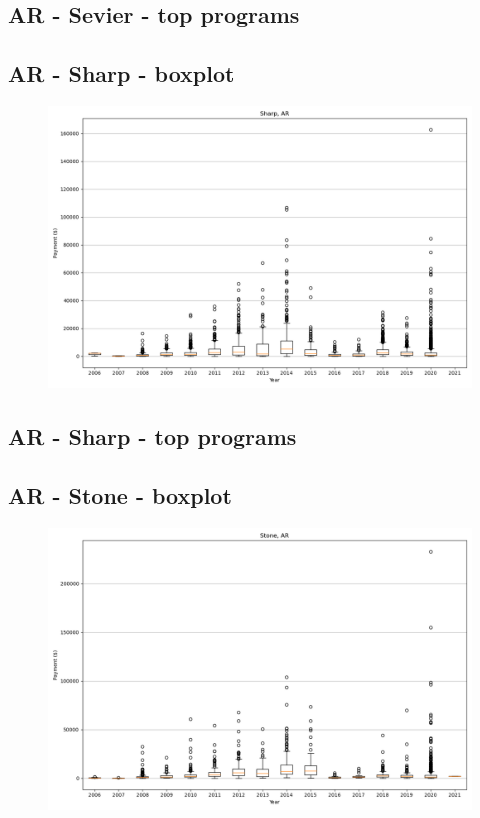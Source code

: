 \subsection*{AR - Sevier - top programs}

\newpage
\subsection*{AR - Sharp - boxplot}
\begin{figure}[h]
\centering
\includegraphics[width=7in]{../output/boxplots/counties/Sharp-AR_boxplot.png}
\end{figure}


\subsection*{AR - Sharp - top programs}

\newpage
\subsection*{AR - Stone - boxplot}
\begin{figure}[h]
\centering
\includegraphics[width=7in]{../output/boxplots/counties/Stone-AR_boxplot.png}
\end{figure}


